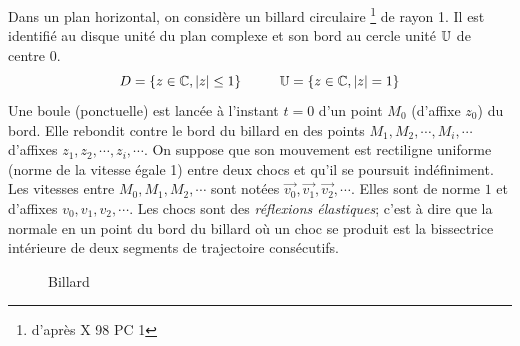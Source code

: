 Dans un plan horizontal, on considère un billard circulaire \footnote{d'après X 98 PC 1} de rayon 1. Il est identifié au disque unité du plan complexe et son bord au cercle unité $\mathbb{U}$ de centre 0.
\begin{displaymath}
  D=\{z\in \mathbb{C}, |z|\leq 1\} \hspace{1cm} \mathbb{U} =\{z\in \mathbb{C}, |z|= 1\}
\end{displaymath}
Une boule (ponctuelle) est lancée à l'instant $t=0$ d'un point $M_0$ (d'affixe $z_0$) du bord. Elle rebondit contre le bord du billard en des points $M_1, M_2, \cdots, M_i, \cdots$ d'affixes $z_1, z_2, \cdots, z_i,\cdots$.\newline
On suppose que son mouvement est rectiligne uniforme (norme de la vitesse égale 1) entre deux chocs et qu'il se poursuit indéfiniment. Les vitesses entre $M_0, M_1, M_2, \cdots$ sont notées $\overrightarrow{v_0}, \overrightarrow{v_1}, \overrightarrow{v_2}, \cdots$. Elles sont de norme $1$ et d'affixes $v_0, v_1, v_2, \cdots$.\newline
Les chocs sont des \emph{réflexions élastiques}; c'est à dire que la normale en un point du bord du billard où un choc se produit est la bissectrice intérieure de deux segments de trajectoire consécutifs.\newline
\begin{figure}[h]
\centering
   \hspace{1cm}
\caption{Billard}
\end{figure}
